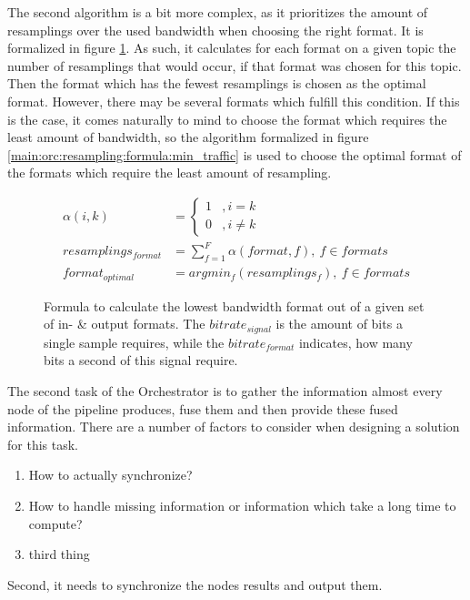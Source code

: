 The second algorithm is a bit more complex, as it prioritizes the amount of resamplings over the used bandwidth when choosing the right format.
It is formalized in figure \ref{main:orc:resampling:formula:min_cpu}.
As such, it calculates for each format on a given topic the number of resamplings that would occur, if that format was chosen for this topic.
Then the format which has the fewest resamplings is chosen as the optimal format.
However, there may be several formats which fulfill this condition.
If this is the case, it comes naturally to mind to choose the format which requires the least amount of bandwidth, so the algorithm formalized in figure \ref{main:orc:resampling:formula:min_traffic} is used to choose the optimal format of the formats which require the least amount of resampling.

\begin{figure}
	\begin{align}
	\alpha(i,k) &=
	\begin{cases}
	1 & , i = k \\
	0 & , i \neq k
	\end{cases} \\[10pt]
	resamplings_{format} &= \sum_{f=1}^{F} \alpha(format, f) ,\ f \in formats\\[10pt]
	format_{optimal} &= argmin_{f}(resamplings_{f}) , \ f \in formats
	\end{align}
	\caption{Formula to calculate the lowest bandwidth format out of a given set of in- \& output formats.
		The $bitrate_{signal}$ is the amount of bits a single sample requires, while the $bitrate_{format}$ indicates, how many bits a second of this signal require.}
	\label{main:orc:resampling:formula:min_cpu}
\end{figure}



The second task of the Orchestrator is to gather the information almost every node of the pipeline produces, fuse them and then provide these fused information.
There are a number of factors to consider when designing a solution for this task.
\begin{enumerate}
	\item How to actually synchronize?
	\item How to handle missing information or information which take a long time to compute?
	\item third thing
\end{enumerate}

Second, it needs to synchronize the nodes results and output them. 

